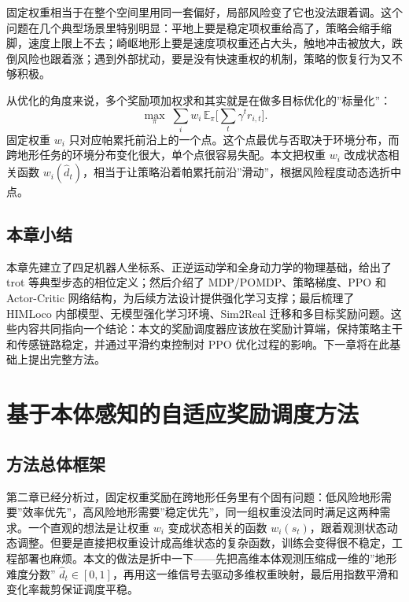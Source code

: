 \documentclass[12pt,a4paper]{ctexart}
\numberwithin{equation}{section}
\numberwithin{table}{section}
\numberwithin{figure}{section}
\newcommand{\subtopic}[1]{\par\addvspace{0.2\baselineskip}\ignorespaces}
\begin{document}
\subtopic{固定权重的天然缺陷}
固定权重相当于在整个空间里用同一套偏好，局部风险变了它也没法跟着调。这个问题在几个典型场景里特别明显：平地上要是稳定项权重给高了，策略会缩手缩脚，速度上限上不去；崎岖地形上要是速度项权重还占大头，触地冲击被放大，跌倒风险也跟着涨；遇到外部扰动，要是没有快速重权的机制，策略的恢复行为又不够积极。

\subtopic{多目标优化视角下的解释}
从优化的角度来说，多个奖励项加权求和其实就是在做多目标优化的”标量化”：
\begin{equation}
\max_\pi\;\sum_i w_i\,\mathbb{E}_\pi\bigl[\textstyle\sum_t\gamma^t r_{i,t}\bigr].
\end{equation}
固定权重 $w_i$ 只对应帕累托前沿上的一个点。这个点最优与否取决于环境分布，而跨地形任务的环境分布变化很大，单个点很容易失配。本文把权重 $w_i$ 改成状态相关函数 $w_i(\hat{d}_t)$，相当于让策略沿着帕累托前沿”滑动”，根据风险程度动态选折中点。

\subsection{本章小结}
本章先建立了四足机器人坐标系、正逆运动学和全身动力学的物理基础，给出了 trot 等典型步态的相位定义；然后介绍了 MDP/POMDP、策略梯度、PPO 和 Actor-Critic 网络结构，为后续方法设计提供强化学习支撑；最后梳理了 HIMLoco 内部模型、无模型强化学习环境、Sim2Real 迁移和多目标奖励问题。这些内容共同指向一个结论：本文的奖励调度器应该放在奖励计算端，保持策略主干和传感链路稳定，并通过平滑约束控制对 PPO 优化过程的影响。下一章将在此基础上提出完整方法。


\clearpage
\section{基于本体感知的自适应奖励调度方法}\label{sec:method}
\subsection{方法总体框架}
\subtopic{动机回顾}
第二章已经分析过，固定权重奖励在跨地形任务里有个固有问题：低风险地形需要”效率优先”，高风险地形需要”稳定优先”，同一组权重没法同时满足这两种需求。一个直观的想法是让权重 $w_i$ 变成状态相关的函数 $w_i(s_t)$，跟着观测状态动态调整。但要是直接把权重设计成高维状态的复杂函数，训练会变得很不稳定，工程部署也麻烦。本文的做法是折中一下——先把高维本体观测压缩成一维的”地形难度分数” $\hat{d}_t\in[0,1]$，再用这一维信号去驱动多维权重映射，最后用指数平滑和变化率裁剪保证调度平稳。
\end{document}
